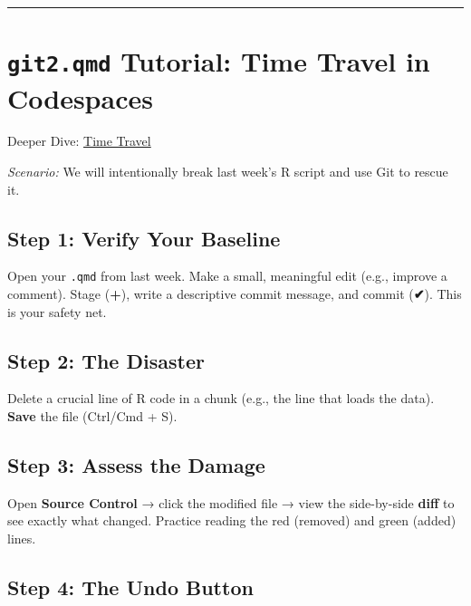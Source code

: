 \documentclass[
  letterpaper,
  DIV=11,
  numbers=noendperiod,
  oneside]{scrreprt}
\begin{document}
\begin{center}\rule{0.5\linewidth}{0.5pt}\end{center}

\section*{\texorpdfstring{\texttt{git2.qmd} Tutorial: Time Travel in
Codespaces}{git2.qmd Tutorial: Time Travel in Codespaces}}\label{git2.qmd-tutorial-time-travel-in-codespaces}


Deeper Dive: \href{git02-tutorial.qmd}{Time Travel}

\emph{Scenario:} We will intentionally break last week's R script and
use Git to rescue it.

\subsection*{Step 1: Verify Your
Baseline}\label{step-1-verify-your-baseline}

Open your \texttt{.qmd} from last week. Make a small, meaningful edit
(e.g., improve a comment). Stage (\textbf{+}), write a descriptive
commit message, and commit (\textbf{✔}). This is your safety net.

\subsection*{Step 2: The Disaster}\label{step-2-the-disaster}

Delete a crucial line of R code in a chunk (e.g., the line that loads
the data). \textbf{Save} the file (Ctrl/Cmd + S).

\subsection*{Step 3: Assess the Damage}\label{step-3-assess-the-damage}

Open \textbf{Source Control} → click the modified file → view the
side-by-side \textbf{diff} to see exactly what changed. Practice reading
the red (removed) and green (added) lines.

\subsection*{Step 4: The Undo Button}\label{step-4-the-undo-button}
\end{document}
